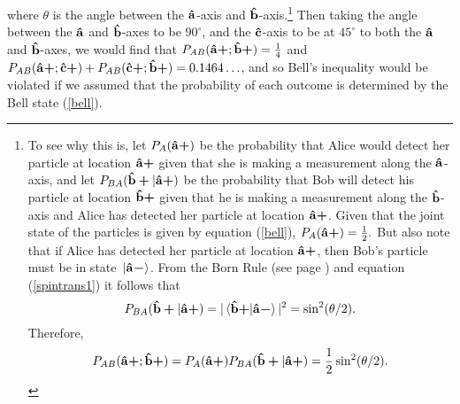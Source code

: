       where $\theta$ is the angle between the $\vb{\hat{{a}}}$-axis and $\vb{\hat{{b}}}$-axis.\footnote{To see why this is, let $P_A(\vb{\hat{{a}}}\bm{+})$ be the probability that Alice would detect her particle at location $\vb{\hat{{a}}}\bm{+}$ given that she is making a measurement along the $\vb{\hat{{a}}}$-axis, and let $P_{BA}(\vb{\hat{{b}}}\bm{+}|\vb{\hat{{a}}}\bm{+})$ be the probability that Bob will detect his particle at location $\vb{\hat{{b}}}\bm{+}$ given that he is making a measurement along the $\vb{\hat{{b}}}$-axis and Alice has detected her particle at location $\vb{\hat{{a}}}\bm{+}$. Given that the joint state of the particles is given by equation (\ref{bell}), $P_A(\vb{\hat{{a}}}\bm{+})=\frac{1}{2}.$ But also note that if  Alice has detected her particle at location  
      $\vb{\hat{{a}}}\bm{+}$, then Bob's particle must be in state $\ket*{\vb{\hat{{a}}}\bm{-}}$. From the Born Rule (see page \pageref{bornrule}) and equation (\ref{spintrans1}) it follows that 
      $$P_{BA}(\uvbp{b}|\uvbp{a})= |\ip*{\uvbp{b}}{\uvbm{a}}|^2=\sin^2(\theta/2).$$ 
      Therefore, $$P_{AB}(\vb{\hat{{a}}}\bm{+};\vb{\hat{{b}}}\bm{+})= P_A(\vb{\hat{{a}}}\bm{+})P_{BA}(\vb{\hat{{b}}}\bm{+}|\vb{\hat{{a}}}\bm{+})=\frac{1}{2}\sin^2(\theta/2).$$} Then taking the angle between the $\vb{\hat{{a}}}$ and $\vb{\hat{{b}}}$-axes to be $90^\circ$, and the $\vb{\hat{{c}}}$-axis to be at $45^\circ$ to both the $\vb{\hat{{a}}}$ and $\vb{\hat{{b}}}$-axes, we would find that $P_{AB}(\vb{\hat{{a}}}\bm{+};\vb{\hat{{b}}}\bm{+})=\frac{1}{4}$ and $P_{AB}(\vb{\hat{{a}}}\bm{+};\vb{\hat{{c}}}\bm{+})+P_{AB}(\vb{\hat{{c}}}\bm{+};\vb{\hat{{b}}}\bm{+})=0.1464\ldots$, and so Bell's inequality would be violated if we assumed that the probability of each outcome is determined by the Bell state  (\ref{bell}). 
